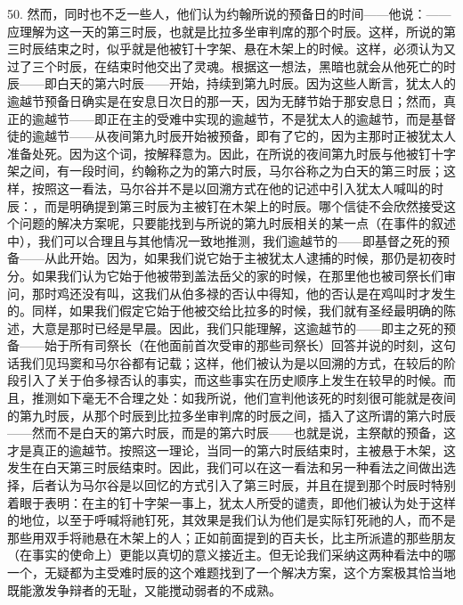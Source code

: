 50. 然而，同时也不乏一些人，他们认为约翰所说的预备日的时间——他说：——应理解为这一天的第三时辰，也就是比拉多坐审判席的那个时辰。这样，所说的第三时辰结束之时，似乎就是他被钉十字架、悬在木架上的时候。这样，必须认为又过了三个时辰，在结束时他交出了灵魂。根据这一想法，黑暗也就会从他死亡的时辰——即白天的第六时辰——开始，持续到第九时辰。因为这些人断言，犹太人的逾越节预备日确实是在安息日次日的那一天，因为无酵节始于那安息日；然而，真正的逾越节——即正在主的受难中实现的逾越节，不是犹太人的逾越节，而是基督徒的逾越节——从夜间第九时辰开始被预备，即有了它的，因为主那时正被犹太人准备处死。因为这个词，按解释意为。因此，在所说的夜间第九时辰与他被钉十字架之间，有一段时间，约翰称之为的第六时辰，马尔谷称之为白天的第三时辰；这样，按照这一看法，马尔谷并不是以回溯方式在他的记述中引入犹太人喊叫的时辰：，而是明确提到第三时辰为主被钉在木架上的时辰。哪个信徒不会欣然接受这个问题的解决方案呢，只要能找到与所说的第九时辰相关的某一点（在事件的叙述中），我们可以合理且与其他情况一致地推测，我们逾越节的——即基督之死的预备——从此开始。因为，如果我们说它始于主被犹太人逮捕的时候，那仍是初夜时分。如果我们认为它始于他被带到盖法岳父的家的时候，在那里他也被司祭长们审问，那时鸡还没有叫，这我们从伯多禄的否认中得知，他的否认是在鸡叫时才发生的。同样，如果我们假定它始于他被交给比拉多的时候，我们就有圣经最明确的陈述，大意是那时已经是早晨。因此，我们只能理解，这逾越节的——即主之死的预备——始于所有司祭长（在他面前首次受审的那些司祭长）回答并说的时刻，这句话我们见玛窦和马尔谷都有记载；这样，他们被认为是以回溯的方式，在较后的阶段引入了关于伯多禄否认的事实，而这些事实在历史顺序上发生在较早的时候。而且，推测如下毫无不合理之处：如我所说，他们宣判他该死的时刻很可能就是夜间的第九时辰，从那个时辰到比拉多坐审判席的时辰之间，插入了这所谓的第六时辰——然而不是白天的第六时辰，而是的第六时辰——也就是说，主祭献的预备，这才是真正的逾越节。按照这一理论，当同一的第六时辰结束时，主被悬于木架，这发生在白天第三时辰结束时。因此，我们可以在这一看法和另一种看法之间做出选择，后者认为马尔谷是以回忆的方式引入了第三时辰，并且在提到那个时辰时特别着眼于表明：在主的钉十字架一事上，犹太人所受的谴责，即他们被认为处于这样的地位，以至于呼喊将祂钉死，其效果是我们认为他们是实际钉死祂的人，而不是那些用双手将祂悬在木架上的人；正如前面提到的百夫长，比主所派遣的那些朋友（在事实的使命上）更能以真切的意义接近主。但无论我们采纳这两种看法中的哪一个，无疑都为主受难时辰的这个难题找到了一个解决方案，这个方案极其恰当地既能激发争辩者的无耻，又能搅动弱者的不成熟。\par

